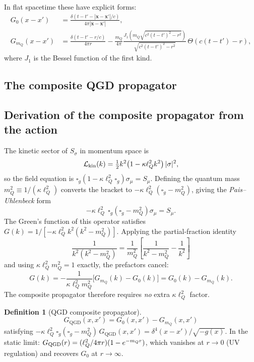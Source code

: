 \documentclass[11pt,a4paper]{article}
\theoremstyle{plain}
\theoremstyle{definition}
\newtheorem{definition}[theorem]{Definition}
\theoremstyle{remark}
\newcommand{\lQ}{\ell_Q}
\newcommand{\mQ}{m_Q}
\newcommand{\boxg}{\square_g}
\begin{document}
In flat spacetime these have explicit forms:
\begin{align}
  G_0(x-x') &= \frac{\delta(t-t'-|\mathbf{x}-\mathbf{x}'|/c)}{4\pi|\mathbf{x}-\mathbf{x}'|},
    \label{eq:G0flat}\\
  G_{\mQ}(x-x') &= \frac{\delta(t-t'-r/c)}{4\pi r}
    - \frac{\mQ}{4\pi}\frac{J_1\!\left(\mQ\sqrt{c^2(t-t')^2-r^2}\right)}
          {\sqrt{c^2(t-t')^2-r^2}}\,\Theta(c(t-t')-r),
    \label{eq:GmQflat}
\end{align}
where $J_1$ is the Bessel function of the first kind.

\subsection{The composite QGD propagator}

\subsection{Derivation of the composite propagator from the action}

The kinetic sector of $S_\sigma$ in momentum space is
\[
  \mathcal{L}_{\rm kin}(k) = \tfrac{1}{2}k^2\!\left(1 - \kappa\lQ^2 k^2\right)|\sigma|^2,
\]
so the field equation is $\boxg(1-\kappa\lQ^2\boxg)\sigma_\mu = S_\mu$.
Defining the quantum mass $\mQ^2 \equiv 1/(\kappa\lQ^2)$ converts the bracket to
$-\kappa\lQ^2(\boxg-\mQ^2)$, giving the \emph{Pais--Uhlenbeck} form
\begin{equation}
  -\kappa\lQ^2\,\boxg\!\left(\boxg - \mQ^2\right)\sigma_\mu = S_\mu.
  \label{eq:PU_repeat}
\end{equation}
The Green's function of this operator satisfies $G(k) = 1/[-\kappa\lQ^2 k^2(k^2-\mQ^2)]$.
Applying the partial-fraction identity
\[
  \frac{1}{k^2(k^2-\mQ^2)} = \frac{1}{\mQ^2}\!\left[\frac{1}{k^2-\mQ^2}-\frac{1}{k^2}\right]
\]
and using $\kappa\lQ^2\mQ^2 = 1$ exactly, the prefactors cancel:
\[
  G(k) = -\frac{1}{\kappa\lQ^2\mQ^2}\bigl[G_{\mQ}(k)-G_0(k)\bigr]
        = G_0(k) - G_{\mQ}(k).
\]
The composite propagator therefore requires \emph{no} extra $\kappa\lQ^2$ factor.

\begin{definition}[QGD composite propagator]
\begin{equation}
  G_{\mathrm{QGD}}(x,x') = G_0(x,x') - G_{\mQ}(x,x')
  \label{eq:GQGD}
\end{equation}
satisfying $-\kappa\lQ^2\boxg(\boxg-\mQ^2)\,G_{\mathrm{QGD}}(x,x') = \delta^4(x-x')/\sqrt{-g(x)}$.
In the static limit: $G_{\rm QGD}(r) = (\ell_Q^2/4\pi r)(1-e^{-\mQ r})$,
which vanishes at $r\to 0$ (UV regulation) and recovers $G_0$ at $r\to\infty$.
\end{definition}
\end{document}
